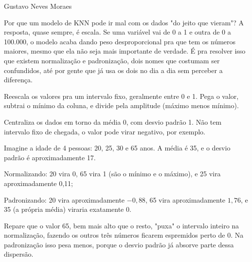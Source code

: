 {Gustavo Neves Moraes}
{

\hspace*{1.5em} Por que um modelo de KNN pode ir mal com os dados "do jeito que vieram"? A resposta, quase sempre, é escala. Se uma variável vai de 0 a 1 e outra de 0 a 100.000, o modelo acaba dando peso desproporcional pra que tem os números maiores, mesmo que ela não seja mais importante de verdade. É pra resolver isso que existem normalização e padronização, dois nomes que costumam ser confundidos, até por gente que já usa os dois no dia a dia sem perceber a diferença.

\subtitle{Normalização (Min-Max Scaling)}

\hspace*{1.5em} Reescala os valores pra um intervalo fixo, geralmente entre 0 e 1. Pega o valor, subtrai o mínimo da coluna, e divide pela amplitude (máximo menos mínimo).


\subtitle{Padronização (Standardization, Z-score)}

\hspace*{1.5em} Centraliza os dados em torno da média 0, com desvio padrão 1. Não tem intervalo fixo de chegada, o valor pode virar negativo, por exemplo.


\subtitle{Um exemplo rápido}

\hspace*{1.5em} Imagine a idade de 4 pessoas: 20, 25, 30 e 65 anos. A média é 35, e o desvio padrão é aproximadamente 17.

\begin{hypeitemize}
\item Normalizando: 20 vira 0, 65 vira 1 (são o mínimo e o máximo), e 25 vira aproximadamente 0,11;
\item Padronizando: 20 vira aproximadamente $-0,88$, 65 vira aproximadamente $1,76$, e 35 (a própria média) viraria exatamente 0.
\end{hypeitemize}

\hspace*{1.5em} Repare que o valor 65, bem mais alto que o resto, "puxa" o intervalo inteiro na normalização, fazendo os outros três números ficarem espremidos perto de 0. Na padronização isso pesa menos, porque o desvio padrão já absorve parte dessa dispersão.


}
